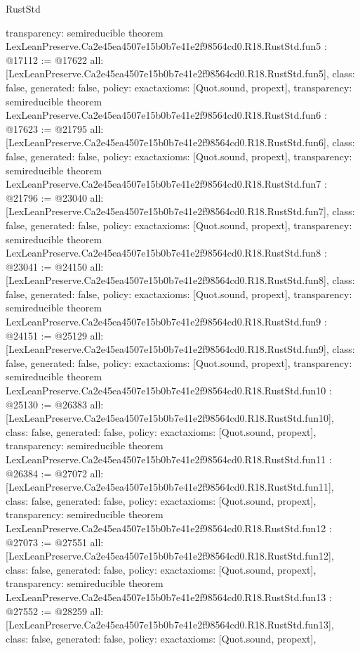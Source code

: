 \begin{lexlean}{RustStd}
\begin{coremodule}
{  transparency: semireducible
}
theorem LexLeanPreserve.Ca2e45ea4507e15b0b7e41e2f98564cd0.R18.RustStd.fun5 : @17112 := @17622 {
  all: [LexLeanPreserve.Ca2e45ea4507e15b0b7e41e2f98564cd0.R18.RustStd.fun5],
  class: false,
  generated: false,
  policy: exact{axioms: [Quot.sound, propext]},
  transparency: semireducible
}
theorem LexLeanPreserve.Ca2e45ea4507e15b0b7e41e2f98564cd0.R18.RustStd.fun6 : @17623 := @21795 {
  all: [LexLeanPreserve.Ca2e45ea4507e15b0b7e41e2f98564cd0.R18.RustStd.fun6],
  class: false,
  generated: false,
  policy: exact{axioms: [Quot.sound, propext]},
  transparency: semireducible
}
theorem LexLeanPreserve.Ca2e45ea4507e15b0b7e41e2f98564cd0.R18.RustStd.fun7 : @21796 := @23040 {
  all: [LexLeanPreserve.Ca2e45ea4507e15b0b7e41e2f98564cd0.R18.RustStd.fun7],
  class: false,
  generated: false,
  policy: exact{axioms: [Quot.sound, propext]},
  transparency: semireducible
}
theorem LexLeanPreserve.Ca2e45ea4507e15b0b7e41e2f98564cd0.R18.RustStd.fun8 : @23041 := @24150 {
  all: [LexLeanPreserve.Ca2e45ea4507e15b0b7e41e2f98564cd0.R18.RustStd.fun8],
  class: false,
  generated: false,
  policy: exact{axioms: [Quot.sound, propext]},
  transparency: semireducible
}
theorem LexLeanPreserve.Ca2e45ea4507e15b0b7e41e2f98564cd0.R18.RustStd.fun9 : @24151 := @25129 {
  all: [LexLeanPreserve.Ca2e45ea4507e15b0b7e41e2f98564cd0.R18.RustStd.fun9],
  class: false,
  generated: false,
  policy: exact{axioms: [Quot.sound, propext]},
  transparency: semireducible
}
theorem LexLeanPreserve.Ca2e45ea4507e15b0b7e41e2f98564cd0.R18.RustStd.fun10 : @25130 := @26383 {
  all: [LexLeanPreserve.Ca2e45ea4507e15b0b7e41e2f98564cd0.R18.RustStd.fun10],
  class: false,
  generated: false,
  policy: exact{axioms: [Quot.sound, propext]},
  transparency: semireducible
}
theorem LexLeanPreserve.Ca2e45ea4507e15b0b7e41e2f98564cd0.R18.RustStd.fun11 : @26384 := @27072 {
  all: [LexLeanPreserve.Ca2e45ea4507e15b0b7e41e2f98564cd0.R18.RustStd.fun11],
  class: false,
  generated: false,
  policy: exact{axioms: [Quot.sound, propext]},
  transparency: semireducible
}
theorem LexLeanPreserve.Ca2e45ea4507e15b0b7e41e2f98564cd0.R18.RustStd.fun12 : @27073 := @27551 {
  all: [LexLeanPreserve.Ca2e45ea4507e15b0b7e41e2f98564cd0.R18.RustStd.fun12],
  class: false,
  generated: false,
  policy: exact{axioms: [Quot.sound, propext]},
  transparency: semireducible
}
theorem LexLeanPreserve.Ca2e45ea4507e15b0b7e41e2f98564cd0.R18.RustStd.fun13 : @27552 := @28259 {
  all: [LexLeanPreserve.Ca2e45ea4507e15b0b7e41e2f98564cd0.R18.RustStd.fun13],
  class: false,
  generated: false,
  policy: exact{axioms: [Quot.sound, propext]},
}
\end{coremodule}
\end{lexlean}

